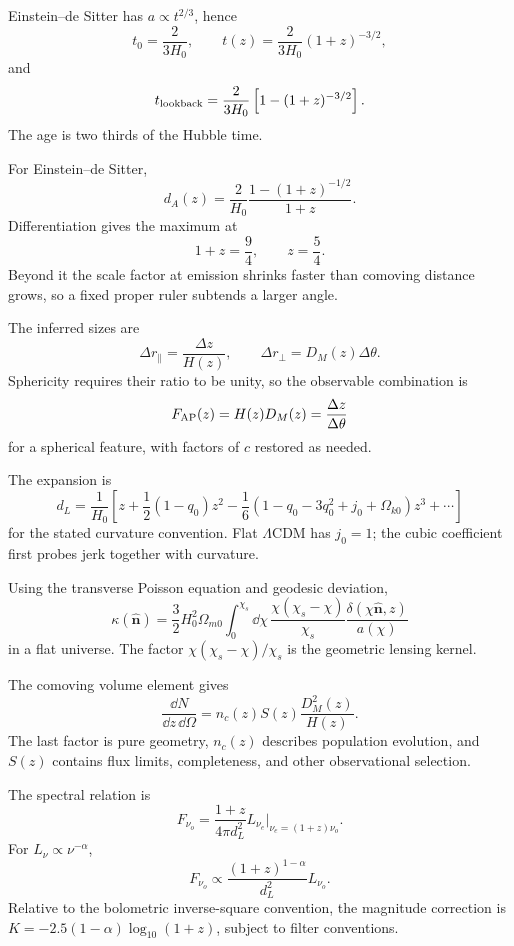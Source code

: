 \begin{solution}
Einstein--de Sitter has \(a\propto t^{2/3}\), hence
\[
t_0=\frac{2}{3H_0},\qquad
t(z)=\frac{2}{3H_0}(1+z)^{-3/2},
\]
and
\[
t_{\rm lookback}=\frac{2}{3H_0}
\left[1-(1+z)^{-3/2}\right].
\]
The age is two thirds of the Hubble time.
\end{solution}

\begin{solution}
For Einstein--de Sitter,
\[
d_A(z)=\frac{2}{H_0}\frac{1-(1+z)^{-1/2}}{1+z}.
\]
Differentiation gives the maximum at
\[
1+z=\frac94,\qquad z=\frac54.
\]
Beyond it the scale factor at emission shrinks faster than comoving distance
grows, so a fixed proper ruler subtends a larger angle.
\end{solution}

\begin{solution}
The inferred sizes are
\[
\Delta r_\parallel=\frac{\Delta z}{H(z)},\qquad
\Delta r_\perp=D_M(z)\Delta\theta.
\]
Sphericity requires their ratio to be unity, so the observable combination is
\[
F_{\rm AP}(z)=H(z)D_M(z)
=\frac{\Delta z}{\Delta\theta}
\]
for a spherical feature, with factors of \(c\) restored as needed.
\end{solution}

\begin{solution}
The expansion is
\[
d_L=\frac1{H_0}\left[
z+\frac12(1-q_0)z^2
-\frac16(1-q_0-3q_0^2+j_0+\Omega_{k0})z^3+\cdots
\right]
\]
for the stated curvature convention.  Flat \(\Lambda\)CDM has \(j_0=1\);
the cubic coefficient first probes jerk together with curvature.
\end{solution}

\begin{solution}
Using the transverse Poisson equation and geodesic deviation,
\[
\kappa(\hat{\bm n})
=\frac32H_0^2\Omega_{m0}\int_0^{\chi_s}\dd\chi\,
\frac{\chi(\chi_s-\chi)}{\chi_s}
\frac{\delta(\chi\hat{\bm n},z)}{a(\chi)}
\]
in a flat universe.  The factor
\(\chi(\chi_s-\chi)/\chi_s\) is the geometric lensing kernel.
\end{solution}

\begin{solution}
The comoving volume element gives
\[
\frac{\dd N}{\dd z\,\dd\Omega}
=n_c(z)S(z)\frac{D_M^2(z)}{H(z)}.
\]
The last factor is pure geometry, \(n_c(z)\) describes population evolution,
and \(S(z)\) contains flux limits, completeness, and other observational
selection.
\end{solution}

\begin{solution}
The spectral relation is
\[
F_{\nu_o}=\frac{1+z}{4\pi d_L^2}
L_{\nu_e}\big|_{\nu_e=(1+z)\nu_o}.
\]
For \(L_\nu\propto\nu^{-\alpha}\),
\[
F_{\nu_o}\propto\frac{(1+z)^{1-\alpha}}{d_L^2}L_{\nu_o}.
\]
Relative to the bolometric inverse-square convention, the magnitude
correction is \(K=-2.5(1-\alpha)\log_{10}(1+z)\), subject to filter
conventions.
\end{solution}

